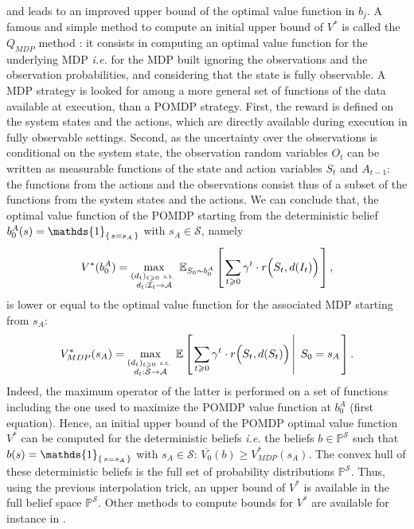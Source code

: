 and leads to an improved upper bound of the optimal value function in $b_j$.
A famous and simple method to compute an initial upper bound of $V^*$ 
is called the $Q_{MDP}$ method \cite{Littman96algorithmsfor}: 
it consists in computing an optimal value function
for the underlying MDP \textit{i.e.} for the MDP built 
ignoring the observations and the observation probabilities, 
and considering that the state is fully observable.
A MDP strategy is looked for among a more general set of functions 
of the data available at execution, 
than a POMDP strategy. 
First, the reward is defined on the system states and the actions,
which are directly available during execution in fully observable settings. 
Second, as the uncertainty over the observations is conditional on the system state,
the observation random variables $O_t$ can be written as measurable functions of the state and action variables $S_t$ and $A_{t-1}$:
the functions from the actions and the observations consist thus of a subset of the functions from the system states and the actions.
We can conclude that, the optimal value function of the POMDP starting from the deterministic belief $b^A_0(s) = \mathds{1}_{ \set{s=s_A}}$ with $s_A \in \mathcal{S}$,
namely 
\[ V^*(b^A_0) = \max_{  \substack{ (d_t)_{t \geqslant 0} \mbox{ \tiny s.t. } \\ d_t: \mathcal{I}_t \rightarrow \mathcal{A}  }} \mathbb{E}_{S_0 \sim b^A_0} \left[ \left.  \sum_{t \geqslant 0} \gamma^t \cdot r\Big(S_t,d(I_t)\Big)  \right. \right], \]
is lower or equal to the optimal value function for the associated MDP starting from $s_A$: 
\[ V_{MDP}^*(s_A) = \max_{  \substack{ (d_t)_{t \geqslant 0} \mbox{ \tiny s.t. } \\ d_t: \mathcal{S} \rightarrow \mathcal{A} } } \mathbb{E} \left[ \left.  \sum_{t \geqslant 0} \gamma^t \cdot r\Big(S_t,d(S_t)\Big) \, \right| \left. \, S_0 = s_A   \right. \right]. \]
Indeed, the maximum operator of the latter 
is performed on a set of functions including 
the one used to maximize the POMDP value function at $b^A_0$ (first equation).
Hence, an initial upper bound of the POMDP optimal value function $V^*$ can be computed for the deterministic beliefs \textit{i.e.} 
the beliefs $b \in \mathbb{P}^{\mathcal{S}}$ such that $b(s) = \mathds{1}_{\set{ s=s_A }}$ with $s_A \in \mathcal{S}$:
$\overline{V_0}(b) \geqslant V_{MDP}^*(s_A)$. 
The convex hull of these deterministic beliefs is the full set of probability distributions $\mathbb{P}^{\mathcal{S}}$.
Thus, using the previous interpolation trick, an upper bound of $V^*$ is available in the full belief space $\mathbb{P}^{\mathcal{S}}$. 
Other methods to compute bounds for $V^*$ are available for instance in \cite{conf/aaai/Hauskrecht97}.

